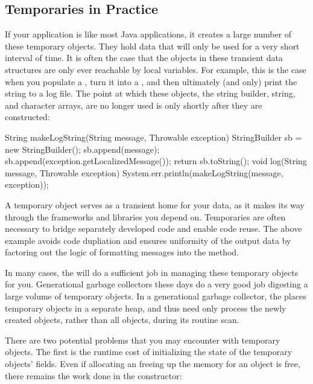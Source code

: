 \subsection{Temporaries in Practice}
If your application is like most Java applications, it creates a large number of
these temporary objects. They hold data that will only be used for a very short
interval of time. It is often the case that the objects in these transient data
structures are only ever reachable by local variables. For example, this is the
case when you populate a , turn it into a ,
and then ultimately (and only) print the string to a log file. The point at
which these objects, the string builder, string, and character arrays, are no
longer used is only shortly after they are constructed:

\begin{shortlisting}
String makeLogString(String message, Throwable exception) {
	StringBuilder sb = new StringBuilder();
	sb.append(message);
	sb.append(exception.getLocalizedMessage());
	return sb.toString();
}
void log(String message, Throwable exception) {
	System.err.println(makeLogString(message, exception));
}
\end{shortlisting}

A temporary object serves as a transient home for your data, as it makes its way
through the frameworks and libraries you depend on. Temporaries are often
necessary to bridge separately developed code and enable code reuse. The above
example avoids code dupliation and ensures uniformity of the output data by
factoring out the logic of formatting messages into the 
method.


In many cases, the \jre will do a sufficient job in managing these temporary
objects for you. Generational garbage collectors  these days do a very good job digesting a large volume of temporary
objects. In a generational garbage collector, the \jre places temporary objects
in a separate heap, and thus need only process the newly created objects, rather
than all objects, during its routine scan.

There are two potential problems that you may encounter with temporary objects.
The first is the runtime cost of initializing the state of the temporary
objects' fields. Even if allocating an freeing up the memory for an object is
free, there remains the work done in the constructor:

